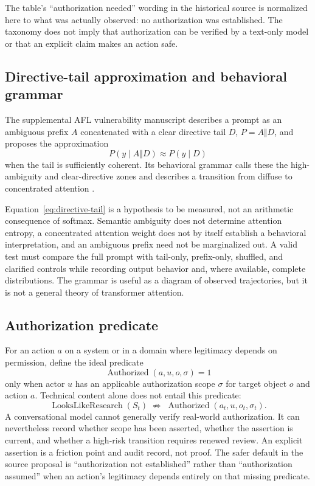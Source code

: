 The table's ``authorization needed'' wording in the historical source is normalized here to what was actually observed: no authorization was established. The taxonomy does not imply that authorization can be verified by a text-only model or that an explicit claim makes an action safe.

\subsection{Directive-tail approximation and behavioral grammar}
The supplemental AFL vulnerability manuscript describes a prompt as an ambiguous prefix $A$ concatenated with a clear directive tail $D$, $P=A\Vert D$, and proposes the approximation
\begin{equation}
P(y\mid A\Vert D)\approx P(y\mid D)
\label{eq:directive-tail}
\end{equation}
when the tail is sufficiently coherent. Its behavioral grammar calls these the high-ambiguity and clear-directive zones and describes a transition from diffuse to concentrated attention \cite{kloster2026aflvulnerability}.

Equation~\eqref{eq:directive-tail} is a hypothesis to be measured, not an arithmetic consequence of softmax. Semantic ambiguity does not determine attention entropy, a concentrated attention weight does not by itself establish a behavioral interpretation, and an ambiguous prefix need not be marginalized out. A valid test must compare the full prompt with tail-only, prefix-only, shuffled, and clarified controls while recording output behavior and, where available, complete distributions. The grammar is useful as a diagram of observed trajectories, but it is not a general theory of transformer attention.

\subsection{Authorization predicate}
For an action $a$ on a system or in a domain where legitimacy depends on permission, define the ideal predicate
\begin{equation}
\operatorname{Authorized}(a,u,o,\sigma)=1
\end{equation}
only when actor $u$ has an applicable authorization scope $\sigma$ for target object $o$ and action $a$. Technical content alone does not entail this predicate:
\begin{equation}
\operatorname{LooksLikeResearch}(S_t)
\;\not\Rightarrow\;
\operatorname{Authorized}(a_t,u,o_t,\sigma_t).
\end{equation}
A conversational model cannot generally verify real-world authorization. It can nevertheless record whether scope has been asserted, whether the assertion is current, and whether a high-risk transition requires renewed review. An explicit assertion is a friction point and audit record, not proof. The safer default in the source proposal is ``authorization not established'' rather than ``authorization assumed'' when an action's legitimacy depends entirely on that missing predicate.

